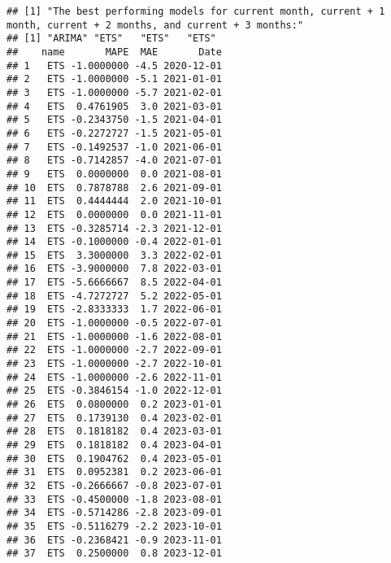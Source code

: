\documentclass[
]{article}
\begin{document}
\begin{verbatim}
## [1] "The best performing models for current month, current + 1 month, current + 2 months, and current + 3 months:"
## [1] "ARIMA" "ETS"   "ETS"   "ETS"  
##    name       MAPE  MAE       Date
## 1   ETS -1.0000000 -4.5 2020-12-01
## 2   ETS -1.0000000 -5.1 2021-01-01
## 3   ETS -1.0000000 -5.7 2021-02-01
## 4   ETS  0.4761905  3.0 2021-03-01
## 5   ETS -0.2343750 -1.5 2021-04-01
## 6   ETS -0.2272727 -1.5 2021-05-01
## 7   ETS -0.1492537 -1.0 2021-06-01
## 8   ETS -0.7142857 -4.0 2021-07-01
## 9   ETS  0.0000000  0.0 2021-08-01
## 10  ETS  0.7878788  2.6 2021-09-01
## 11  ETS  0.4444444  2.0 2021-10-01
## 12  ETS  0.0000000  0.0 2021-11-01
## 13  ETS -0.3285714 -2.3 2021-12-01
## 14  ETS -0.1000000 -0.4 2022-01-01
## 15  ETS  3.3000000  3.3 2022-02-01
## 16  ETS -3.9000000  7.8 2022-03-01
## 17  ETS -5.6666667  8.5 2022-04-01
## 18  ETS -4.7272727  5.2 2022-05-01
## 19  ETS -2.8333333  1.7 2022-06-01
## 20  ETS -1.0000000 -0.5 2022-07-01
## 21  ETS -1.0000000 -1.6 2022-08-01
## 22  ETS -1.0000000 -2.7 2022-09-01
## 23  ETS -1.0000000 -2.7 2022-10-01
## 24  ETS -1.0000000 -2.6 2022-11-01
## 25  ETS -0.3846154 -1.0 2022-12-01
## 26  ETS  0.0800000  0.2 2023-01-01
## 27  ETS  0.1739130  0.4 2023-02-01
## 28  ETS  0.1818182  0.4 2023-03-01
## 29  ETS  0.1818182  0.4 2023-04-01
## 30  ETS  0.1904762  0.4 2023-05-01
## 31  ETS  0.0952381  0.2 2023-06-01
## 32  ETS -0.2666667 -0.8 2023-07-01
## 33  ETS -0.4500000 -1.8 2023-08-01
## 34  ETS -0.5714286 -2.8 2023-09-01
## 35  ETS -0.5116279 -2.2 2023-10-01
## 36  ETS -0.2368421 -0.9 2023-11-01
## 37  ETS  0.2500000  0.8 2023-12-01
\end{verbatim}
\end{document}
